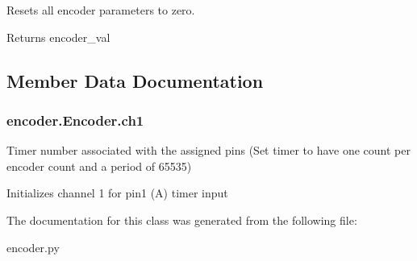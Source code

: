 Resets all encoder parameters to zero. 

\begin{DoxyReturn}{Returns}
encoder\+\_\+val 
\end{DoxyReturn}


\subsection{Member Data Documentation}
\subsubsection[{\texorpdfstring{ch1}{ch1}}]{\setlength{\rightskip}{0pt plus 5cm}encoder.\+Encoder.\+ch1}\hypertarget{classencoder_1_1Encoder_a076f2be10f58f336dd7fb70b55feee6f}{}\label{classencoder_1_1Encoder_a076f2be10f58f336dd7fb70b55feee6f}


Timer number associated with the assigned pins (Set timer to have one count per encoder count and a period of 65535) 

Initializes channel 1 for pin1 (A) timer input 

The documentation for this class was generated from the following file\+:\begin{DoxyCompactItemize}
\item 
encoder.\+py\end{DoxyCompactItemize}
